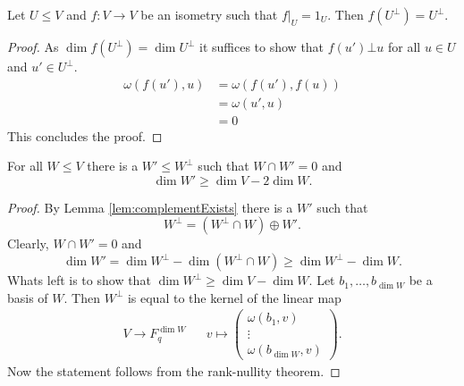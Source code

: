 \begin{lemma}\label{lem:isomStaysInCompl}
Let $U\leq V$ and $f\colon V\to V$ be an isometry such that $f|_U=1_U$. Then $f(U^\bot)= U^\bot$.
\end{lemma}
\begin{proof}
As $\dim f(U^\bot)=\dim U^\bot$ it suffices to show that $f(u')\bot u$ for all $u\in U$ and $u'\in U^\bot$.
\begin{align*}
\omega(f(u'),u)&=\omega(f(u'),f(u))\\
&=\omega(u',u)\\
&=0
\end{align*}
This concludes the proof.
\end{proof}

\begin{lemma}\label{lem:largeOrthogonal}
For all $W\leq V$ there is a $W'\leq W^\bot$ such that $W\cap W'=0$ and \[\dim W'\geq \dim V-2\dim W.\]
\end{lemma}
\begin{proof}
By Lemma \ref{lem:complementExists} there is a $W'$ such that 
\[W^\bot=(W^\bot\cap W)\oplus W'.\]
Clearly, $W\cap W'=0$ and 
\[\dim W'=\dim W^\bot - \dim (W^\bot\cap W)\geq \dim W^\bot- \dim W.\]
Whats left is to show that $\dim W^\bot\geq \dim V-\dim W$. Let $b_1,\dots, b_{\dim W}$ be a basis of $W$. Then $W^\bot$ is equal to the kernel of the linear map 
\begin{align*}
V\to F_q^{\dim W}&& v\mapsto
\begin{pmatrix}
\omega(b_1,v)\\
\vdots\\
\omega(b_{\dim W},v)
\end{pmatrix}.
\end{align*}
Now the statement follows from the rank-nullity theorem.
\end{proof}


